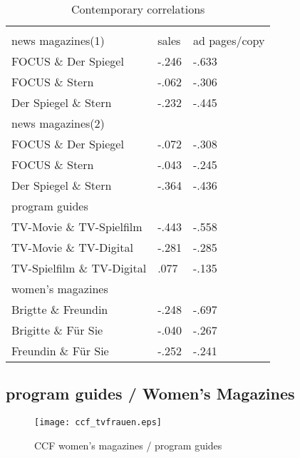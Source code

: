 \documentclass[12pt,a4paper]{scrreprt}
\begin{document}
\begin{table}[!htbp] \centering
	\caption{Contemporary correlations}
	\label{tab_CCF}
\begin{tabular}{@{\extracolsep{5pt}} lll}
\\[-1.8ex]\hline 
\hline \\[-1.8ex]
	news magazines(1) & sales & ad pages/copy \\
	\hline
	FOCUS \& Der Spiegel & -.246 & -.633 \\
	FOCUS \& Stern & -.062 & -.306 \\
	Der Spiegel \& Stern & -.232 & -.445 \\
	\hline
	news magazines(2) & & \\
	\hline
	FOCUS \& Der Spiegel & -.072 & -.308 \\
	FOCUS \& Stern & -.043 & -.245 \\
	Der Spiegel \& Stern & -.364 & -.436 \\
	\hline
	program guides & & \  \\ 
	\hline
	TV-Movie \& TV-Spielfilm & -.443 & -.558 \\
	TV-Movie \& TV-Digital & -.281 & -.285 \\
	TV-Spielfilm \& TV-Digital & .077 & -.135 \\ 
	\hline
	women's magazines &  & \  \\ 
	\hline
	Brigtte \& Freundin & -.248 & -.697 \\ 
	Brigitte \& Für Sie & -.040 & -.267 \\ 
	Freundin \& Für Sie & -.252 & -.241 \\ \hline
\end{tabular}
	\end{table}

\subsection{program guides / Women's Magazines }

\begin{figure}[H]
\caption{CCF women's magazines / program guides}
\label{}
	\centering
	\texttt{[image: ccf\_tvfrauen.eps]}
\end{figure}
\end{document}
